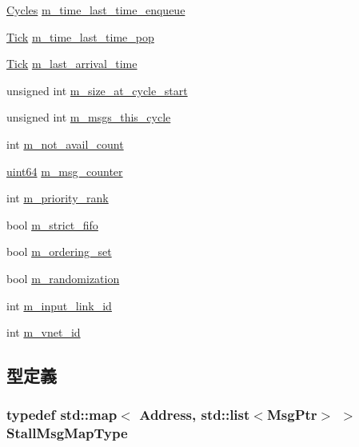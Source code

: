 \begin{DoxyCompactItemize}
\hyperlink{classCycles}{Cycles} \hyperlink{classMessageBuffer_ad99d9b33ed6c9adbe0b672c6af0a5bf7}{m\_\-time\_\-last\_\-time\_\-enqueue}
\item 
\hyperlink{base_2types_8hh_a5c8ed81b7d238c9083e1037ba6d61643}{Tick} \hyperlink{classMessageBuffer_a6d825eaf3c6cf89227a953fcb5e91af3}{m\_\-time\_\-last\_\-time\_\-pop}
\item 
\hyperlink{base_2types_8hh_a5c8ed81b7d238c9083e1037ba6d61643}{Tick} \hyperlink{classMessageBuffer_a691773cf753228bbb617fc07019c45bb}{m\_\-last\_\-arrival\_\-time}
\item 
unsigned int \hyperlink{classMessageBuffer_ad4ef3631d539c1c0a0434b51bdabf68c}{m\_\-size\_\-at\_\-cycle\_\-start}
\item 
unsigned int \hyperlink{classMessageBuffer_af37dc7ab69d718640e0622b64136543f}{m\_\-msgs\_\-this\_\-cycle}
\item 
int \hyperlink{classMessageBuffer_adb933651b11421e2e911a352db8edc94}{m\_\-not\_\-avail\_\-count}
\item 
\hyperlink{TypeDefines_8hh_a29940ae63ec06c9998bba873e25407ad}{uint64} \hyperlink{classMessageBuffer_a3ee0247e7b99d743ac9ec4d45edba8af}{m\_\-msg\_\-counter}
\item 
int \hyperlink{classMessageBuffer_a4ac5345a63b7618a47b477b57cde5ca0}{m\_\-priority\_\-rank}
\item 
bool \hyperlink{classMessageBuffer_a2d9ad769da997d66f23de51048f90566}{m\_\-strict\_\-fifo}
\item 
bool \hyperlink{classMessageBuffer_ae6fd7f88210bae2cdbd67370062be24c}{m\_\-ordering\_\-set}
\item 
bool \hyperlink{classMessageBuffer_aa846ca9467116a26a879dc4b262cf36a}{m\_\-randomization}
\item 
int \hyperlink{classMessageBuffer_ad214be76cbb069cc3acb2a843fffb26f}{m\_\-input\_\-link\_\-id}
\item 
int \hyperlink{classMessageBuffer_a3cd373167bcac343aba16bd3525cc0a2}{m\_\-vnet\_\-id}
\end{DoxyCompactItemize}


\subsection{型定義}
\hypertarget{classMessageBuffer_a4f77caf961eb3357bbaa1534420e8213}{
\subsubsection[{StallMsgMapType}]{\setlength{\rightskip}{0pt plus 5cm}typedef std::map$<$ {\bf Address}, {\bf std::list}$<${\bf MsgPtr}$>$ $>$ {\bf StallMsgMapType}}}
\label{classMessageBuffer_a4f77caf961eb3357bbaa1534420e8213}



